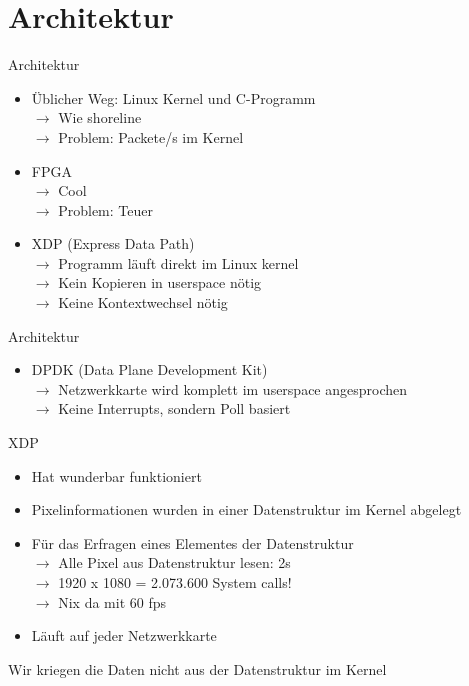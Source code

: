 \documentclass[12pt,donthandout,notes=dontshow,xcolor=table]{beamer}
\begin{document}
\section{Architektur}
\begin{frame}{Architektur}
	\begin{itemize}
		\item Üblicher Weg: Linux Kernel und C-Programm\\
		$\rightarrow$ Wie shoreline\\
		$\rightarrow$ Problem: Packete/s im Kernel
		\pause
		\item FPGA\\
		$\rightarrow$ Cool\\
		$\rightarrow$ Problem: Teuer
		\pause
		\item XDP (Express Data Path)\\
		$\rightarrow$ Programm läuft direkt im Linux kernel\\
		$\rightarrow$ Kein Kopieren in userspace nötig\\
		$\rightarrow$ Keine Kontextwechsel nötig
	\end{itemize}
\end{frame}

\begin{frame}{Architektur}
	\begin{itemize}
		\item DPDK (Data Plane Development Kit)\\
		$\rightarrow$ Netzwerkkarte wird komplett im userspace angesprochen\\
		$\rightarrow$ Keine Interrupts, sondern Poll basiert
	\end{itemize}
\end{frame}

\begin{frame}{XDP}
	\begin{itemize}
		\item Hat wunderbar funktioniert
		\item Pixelinformationen wurden in einer Datenstruktur im Kernel abgelegt
		\item Für das Erfragen eines Elementes der Datenstruktur\\
		$\rightarrow$ Alle Pixel aus Datenstruktur lesen: 2s\\
		\hspace{1cm} $\rightarrow$ 1920 x 1080 = 2.073.600 System calls! \\
		$\rightarrow$ Nix da mit 60 fps
		\item Läuft auf jeder Netzwerkkarte
	\end{itemize}
	\pause
	\begin{tcolorbox}[title=Problem]
		Wir kriegen die Daten nicht aus der Datenstruktur im Kernel
	\end{tcolorbox}
\end{frame}
\end{document}
